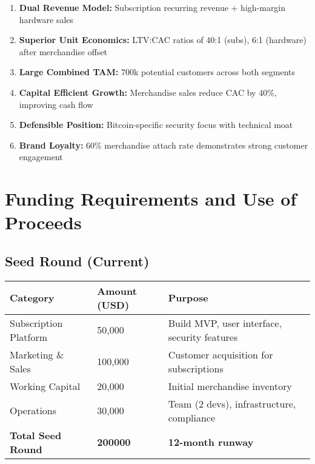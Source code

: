 \documentclass[11pt]{article}
\newcommand{\merchAttachRate}{60}
\newcommand{\seedAmount}{200000}
\begin{document}
\begin{enumerate}
  \item \textbf{Dual Revenue Model:} Subscription recurring revenue + high-margin hardware sales
  \item \textbf{Superior Unit Economics:} LTV:CAC ratios of 40:1 (subs), 6:1 (hardware) after merchandise offset
  \item \textbf{Large Combined TAM:} 700k potential customers across both segments
  \item \textbf{Capital Efficient Growth:} Merchandise sales reduce CAC by 40\%, improving cash flow
  \item \textbf{Defensible Position:} Bitcoin-specific security focus with technical moat
  \item \textbf{Brand Loyalty:} \merchAttachRate\% merchandise attach rate demonstrates strong customer engagement
\end{enumerate}

\section{Funding Requirements and Use of Proceeds}

\subsection{Seed Round (Current)}
\begin{table}[H]
\centering
\begin{tabularx}{\linewidth}{l Y Y}
\toprule
Category & Amount (USD) & Purpose \\\midrule
Subscription Platform & 50,000 & Build MVP, user interface, security features \\
Marketing \& Sales & 100,000 & Customer acquisition for subscriptions \\
Working Capital & 20,000 & Initial merchandise inventory \\
Operations & 30,000 & Team (2 devs), infrastructure, compliance \\
\textbf{Total Seed Round} & \textbf{\seedAmount} & \textbf{12-month runway} \\
\bottomrule
\end{tabularx}
\end{table}
\end{document}
